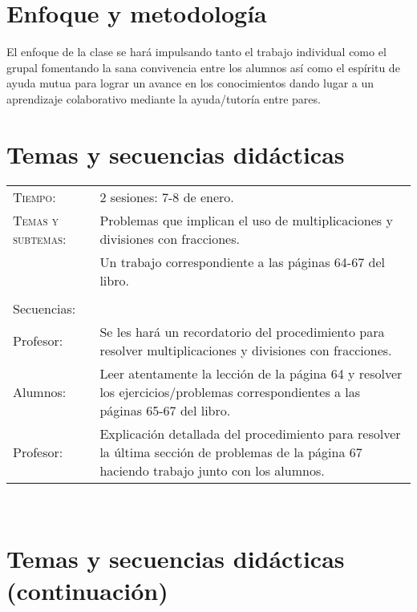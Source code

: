 \documentclass[letterpaper,10pt]{article}
\begin{document}
\section{Enfoque y metodolog\'ia}

El enfoque de la clase se har\'a impulsando tanto el trabajo individual como el 
grupal fomentando la sana convivencia entre los alumnos as\'i como el esp\'iritu
de ayuda mutua para lograr un avance en los conocimientos dando lugar a un 
aprendizaje colaborativo mediante la ayuda/tutor\'ia entre pares.


\section{Temas  y secuencias did\'acticas}
\begin{tabular}[t]{R{0.25\textwidth}p{0.71\textwidth}}
    \textsc{Tiempo:}          & 2 sesiones: 7-8 de enero. \\
    \textsc{Temas y subtemas:}& Problemas que implican el uso de 
    multiplicaciones y divisiones con fracciones.\\
    & Un trabajo correspondiente a las 
    p\'aginas 64-67 del libro. \\ \\
    \large{\sc Secuencias:} \\
    Profesor:   & Se les har\'a un recordatorio del procedimiento para resolver 
    multiplicaciones y divisiones con fracciones. \\
    Alumnos:     & Leer atentamente la lecci\'on de la p\'agina 64 y resolver los 
    ejercicios/problemas correspondientes a las p\'aginas 65-67 del libro. \\
    Profesor: & Explicación detallada del procedimiento para resolver la \'ultima
    secci\'on de problemas de la p\'agina 67 haciendo trabajo junto con los 
    alumnos. \\ 
\hline
\end{tabular}
\\
\newpage
\section{Temas  y secuencias did\'acticas (continuaci\'on)}
\end{document}
